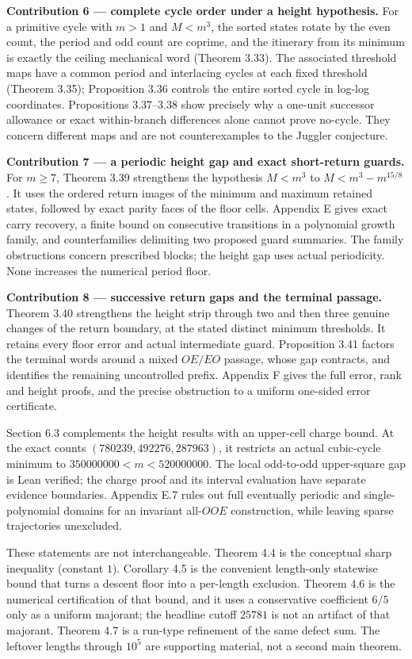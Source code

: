\documentclass[12pt]{article}
\begin{document}
\textbf{Contribution 6 --- complete cycle order under a height
hypothesis.} For a primitive cycle with \(m>1\) and \(M<m^3\), the
sorted states rotate by the even count, the period and odd count are
coprime, and the itinerary from its minimum is exactly the ceiling
mechanical word (Theorem 3.33). The associated threshold maps have a
common period and interlacing cycles at each fixed threshold (Theorem
3.35); Proposition 3.36 controls the entire sorted cycle in log-log
coordinates. Propositions 3.37--3.38 show precisely why a one-unit
successor allowance or exact within-branch differences alone cannot
prove no-cycle. They concern different maps and are not counterexamples
to the Juggler conjecture.

\textbf{Contribution 7 --- a periodic height gap and exact short-return
guards.} For \(m\ge7\), Theorem 3.39 strengthens the hypothesis
\(M<m^3\) to \(M<m^3-m^{15/8}\). It uses the ordered return images of
the minimum and maximum retained states, followed by exact parity faces
of the floor cells. Appendix E gives exact carry recovery, a finite
bound on consecutive transitions in a polynomial growth family, and
counterfamilies delimiting two proposed guard summaries. The family
obstructions concern prescribed blocks; the height gap uses actual
periodicity. None increases the numerical period floor.

\textbf{Contribution 8 --- successive return gaps and the terminal
passage.} Theorem 3.40 strengthens the height strip through two and then
three genuine changes of the return boundary, at the stated distinct
minimum thresholds. It retains every floor error and actual intermediate
guard. Proposition 3.41 factors the terminal words around a mixed
\(OE/EO\) passage, whose gap contracts, and identifies the remaining
uncontrolled prefix. Appendix F gives the full error, rank and height
proofs, and the precise obstruction to a uniform one-sided error
certificate.

Section 6.3 complements the height results with an upper-cell charge
bound. At the exact counts \((780239,492276,287963)\), it restricts an
actual cubic-cycle minimum to \(350000000<m<520000000\). The local
odd-to-odd upper-square gap is Lean verified; the charge proof and its
interval evaluation have separate evidence boundaries. Appendix E.7
rules out full eventually periodic and single-polynomial domains for an
invariant all-\(OOE\) construction, while leaving sparse trajectories
unexcluded.

These statements are not interchangeable. Theorem 4.4 is the conceptual
sharp inequality (constant \(1\)). Corollary 4.5 is the convenient
length-only statewise bound that turns a descent floor into a per-length
exclusion. Theorem 4.6 is the numerical certification of that bound, and
it uses a conservative coefficient \(6/5\) only as a uniform majorant;
the headline cutoff \(25781\) is not an artifact of that majorant.
Theorem 4.7 is a run-type refinement of the same defect sum. The
leftover lengths through \(10^5\) are supporting material, not a second
main theorem.
\end{document}
